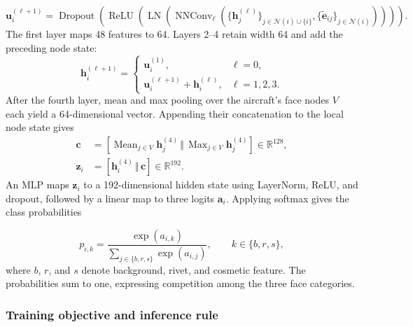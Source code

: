 \documentclass[12pt,a4paper]{article}
\begin{document}
\begin{equation}
\mathbf{u}_{i}^{(\ell+1)}=
\operatorname{Dropout}\!\left(\operatorname{ReLU}\!\left(\operatorname{LN}\!\left(
\operatorname{NNConv}_{\ell}(\{\mathbf{h}_{j}^{(\ell)}\}_{j\in\mathcal{N}(i)\cup\{i\}},\{\tilde{\mathbf{e}}_{ij}\}_{j\in\mathcal{N}(i)})
\right)\right)\right).
\label{eq:shared_message_update}
\end{equation}
The first layer maps 48 features to 64. Layers 2--4 retain width 64 and add the preceding node state:
\begin{equation}
\mathbf{h}_{i}^{(\ell+1)}=
\begin{cases}
\mathbf{u}_{i}^{(1)}, & \ell=0,\\
\mathbf{u}_{i}^{(\ell+1)}+\mathbf{h}_{i}^{(\ell)}, & \ell=1,2,3.
\end{cases}
\label{eq:residual_update}
\end{equation}
After the fourth layer, mean and max pooling over the aircraft's face nodes $V$ each yield a 64-dimensional vector. Appending their concatenation to the local node state gives
\begin{equation}
\begin{aligned}
\mathbf{c}&=\left[\operatorname{Mean}_{j\in V}\mathbf{h}_{j}^{(4)}
\,\Vert\,\operatorname{Max}_{j\in V}\mathbf{h}_{j}^{(4)}\right]\in\mathbb{R}^{128},\\
\mathbf{z}_i&=\left[\mathbf{h}_{i}^{(4)}\,\Vert\,\mathbf{c}\right]\in\mathbb{R}^{192}.
\end{aligned}
\label{eq:local_global_context}
\end{equation}
An MLP maps $\mathbf{z}_i$ to a 192-dimensional hidden state using LayerNorm, ReLU, and dropout, followed by a linear map to three logits $\mathbf{a}_i$. Applying softmax gives the class probabilities

\begin{equation}
p_{i,k}=\frac{\exp(a_{i,k})}{\sum_{j\in\{b,r,s\}}\exp(a_{i,j})},
\qquad k\in\{b,r,s\},
\label{eq:three_class_probabilities}
\end{equation}
where $b$, $r$, and $s$ denote background, rivet, and cosmetic feature. The probabilities sum to one, expressing competition among the three face categories.

\subsubsection{Training objective and inference rule}\label{sec:training_inference}
\end{document}
